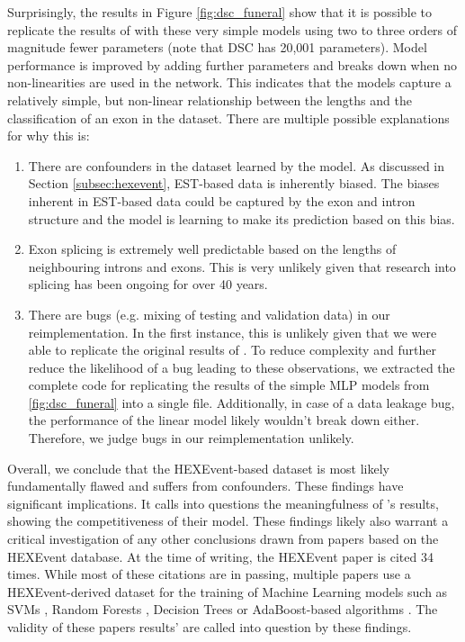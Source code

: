 Surprisingly, the results in Figure \ref{fig:dsc_funeral} show that it is possible to replicate the results of \cite{dsc} with these very simple models using two to three orders of magnitude fewer parameters (note that DSC has 20,001 parameters). Model performance is improved by adding further parameters and breaks down when no non-linearities are used in the network. This indicates that the models capture a relatively simple, but non-linear relationship between the lengths and the classification of an exon in the dataset. 
There are multiple possible explanations for why this is:
\begin{enumerate}
	\item There are confounders in the dataset learned by the model. As discussed in Section \ref{subsec:hexevent}, EST-based data is inherently biased. The biases inherent in EST-based data could be captured by the exon and intron structure and the model is learning to make its prediction based on this bias. 
	\item Exon splicing is extremely well predictable based on the lengths of neighbouring introns and exons. This is very unlikely given that research into splicing has been ongoing for over 40 years. 
	\item There are bugs (e.g. mixing of testing and validation data) in our reimplementation. In the first instance, this is unlikely given that we were able to replicate the original results of \cite{dsc}. To reduce complexity and further reduce the likelihood of a bug leading to these observations, we extracted the complete code for replicating the results of the simple MLP models from \ref{fig:dsc_funeral} into a single file. Additionally, in case of a data leakage bug, the performance of the linear model likely wouldn't break down either. Therefore, we judge bugs in our reimplementation unlikely.
\end{enumerate}

Overall, we conclude that the HEXEvent-based dataset is most likely fundamentally flawed and suffers from confounders.
These findings have significant implications. It calls into questions the meaningfulness of \cite{dsc}'s results, showing the competitiveness of their model. These findings likely also warrant a critical investigation of any other conclusions drawn from papers based on the HEXEvent database. At the time of writing, the HEXEvent paper is cited 34 times. While most of these citations are in passing, multiple papers use a HEXEvent-derived dataset for the training of Machine Learning models such as SVMs \cite{buschhertel}, Random Forests \cite{flawed4} \cite{flawed1}, Decision Trees \cite{flawed2} or AdaBoost-based algorithms \cite{flawed3}. The validity of these papers results' are called into question by these findings.

